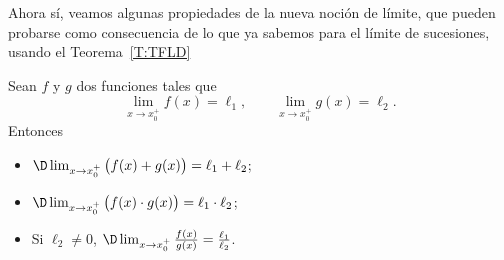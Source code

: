 Ahora sí, veamos algunas propiedades de la nueva noción de límite, que pueden probarse como consecuencia de lo que ya sabemos para el límite de sucesiones, usando el Teorema~\ref{T:TFLD}

\begin{proposition}
    Sean $f$ y $g$ dos funciones tales que
    \[
    \lim_{x\to x_0^+} f(x)=\ell_1,
    \qquad
    \lim_{x\to x_0^+} g(x)=\ell_2.
    \]
    Entonces
    \begin{itemize}
        \item $\D \lim_{x\to x_0^+} \big( f(x) + g(x) \big) = \ell_1 + \ell_2$;
        \item $\D \lim_{x\to x_0^+} \big( f(x) \cdot g(x) \big) = \ell_1 \cdot \ell_2$;
        \item Si $\ell_2\neq 0$, $\D \lim_{x\to x_0^+} \frac{f(x)}{g(x)} = \frac{\ell_1}{\ell_2}$.
    \end{itemize}
\end{proposition}

